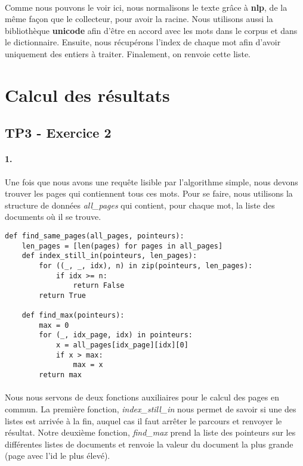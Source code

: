 \documentclass[10pt,a4paper]{article}
\begin{document}
\paragraph{}Comme nous pouvons le voir ici, nous normalisons le texte grâce à \textbf{nlp}, de la même façon que le collecteur, pour avoir la racine. Nous utilisons aussi la bibliothèque \textbf{unicode} afin d'être en accord avec les mots dans le corpus et dans le dictionnaire. Ensuite, nous récupérons l'index de chaque mot afin d'avoir uniquement des entiers à traiter. Finalement, on renvoie cette liste.


\section{Calcul des résultats}
\subsection{TP3 - Exercice 2}
\paragraph{1.} Une fois que nous avons une requête lisible par l'algorithme simple, nous devons trouver les pages qui contiennent tous ces mots. Pour se faire, nous utilisons la structure de données \textit{all\_pages} qui contient, pour chaque mot, la liste des documents où il se trouve.

\newpage %

\begin{verbatim}
def find_same_pages(all_pages, pointeurs):
    len_pages = [len(pages) for pages in all_pages]
    def index_still_in(pointeurs, len_pages):
        for ((_, _, idx), n) in zip(pointeurs, len_pages):
            if idx >= n:
                return False
        return True
        
    def find_max(pointeurs):
        max = 0
        for (_, idx_page, idx) in pointeurs:
            x = all_pages[idx_page][idx][0]
            if x > max:
                max = x
        return max
\end{verbatim}

\paragraph{}Nous nous servons de deux fonctions auxiliaires pour le calcul des pages en commun. La première fonction, \textit{index\_still\_in} nous permet de savoir si une des listes est arrivée à la fin, auquel cas il faut arrêter le parcours et renvoyer le résultat. Notre deuxième fonction, \textit{find\_max} prend la liste des pointeurs sur les différentes listes de documents et renvoie la valeur du document la plus grande (page avec l'id le plus élevé).
\end{document}
